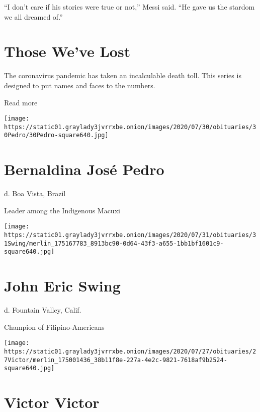 ``I don't care if his stories were true or not,'' Messi said. ``He gave
us the stardom we all dreamed of.''

\href{https://www.nytimes3xbfgragh.onion/interactive/2020/obituaries/people-died-coronavirus-obituaries.html?action=click\&pgtype=Article\&state=default\&region=BELOW_MAIN_CONTENT\&context=covid_obits_promo}{}

\hypertarget{those-weve-lost}{%
\section{Those We've Lost}\label{those-weve-lost}}

The coronavirus pandemic has taken an incalculable death toll. This
series is designed to put names and faces to the numbers.

Read more

\texttt{[image: https://static01.graylady3jvrrxbe.onion/images/2020/07/30/obituaries/30Pedro/30Pedro-square640.jpg]}

\hypertarget{bernaldina-josuxe9-pedro}{%
\section{Bernaldina José Pedro}\label{bernaldina-josuxe9-pedro}}

d. Boa Vista, Brazil

Leader among the Indigenous Macuxi

\texttt{[image: https://static01.graylady3jvrrxbe.onion/images/2020/07/31/obituaries/31Swing/merlin\_175167783\_8913bc90-0d64-43f3-a655-1bb1bf1601c9-square640.jpg]}

\hypertarget{john-eric-swing}{%
\section{John Eric Swing}\label{john-eric-swing}}

d. Fountain Valley, Calif.

Champion of Filipino-Americans

\texttt{[image: https://static01.graylady3jvrrxbe.onion/images/2020/07/27/obituaries/27Victor/merlin\_175001436\_38b11f8e-227a-4e2c-9821-7618af9b2524-square640.jpg]}

\hypertarget{victor-victor}{%
\section{Victor Victor}\label{victor-victor}}

